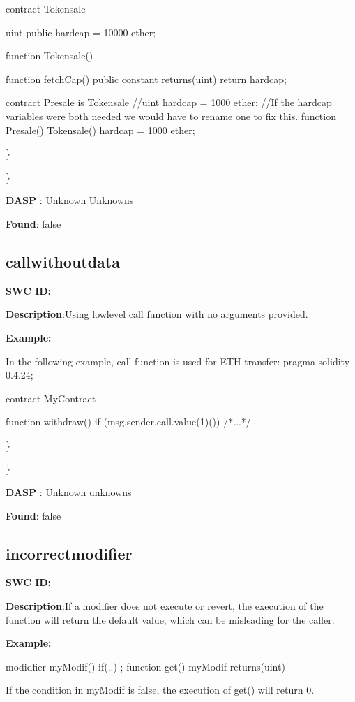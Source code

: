 \documentclass{article}
\begin{document}
contract Tokensale {
    uint public hardcap = 10000 ether;

    function Tokensale() {}

    function fetchCap() public constant returns(uint) {
        return hardcap;
    }
}

contract Presale is Tokensale {
    //uint hardcap = 1000 ether;
    //If the hardcap variables were both needed we would have to rename one to fix this.
    function Presale() Tokensale() {
        hardcap = 1000 ether;
    }
}

\} 

\} 

\textbf{DASP} : Unknown Unknowns

\textbf{Found}: false

\subsection{call\textunderscore without\textunderscore data} 
\textbf{SWC \textunderscore ID:} 

\textbf{Description}:Using low\textendash level call function with no arguments provided.


\textbf{Example:} 

In the following example, call function is used for ETH transfer:
pragma solidity 0.4.24;

contract MyContract {

    function withdraw() {
        if (msg.sender.call.value(1)()) {
        /*...*/
        }
    }
}

\} 

\} 

\textbf{DASP} : Unknown unknowns

\textbf{Found}: false

\subsection{incorrect\textunderscore modifier} 
\textbf{SWC \textunderscore ID:} 

\textbf{Description}:If a modifier does not execute \textunderscore  or revert, the execution of the function will return the default value, which can be misleading for the caller.


\textbf{Example:} 

modidfier myModif(){
    if(..){
      \textunderscore ;
    }
}
function get() myModif returns(uint){}

If the condition in myModif is false, the execution of get() will return 0.
\end{document}
